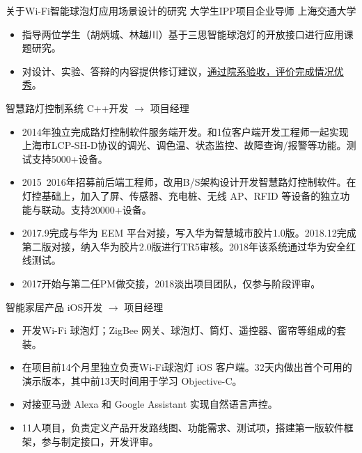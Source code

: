 \documentclass[10pt,a4paper]{moderncv}
\begin{document}
{关于Wi-Fi智能球泡灯应用场景设计的研究}
{大学生IPP项目企业导师}
{上海交通大学}{}
{
\begin{itemize}
	\item 指导两位学生（胡炳城、林越川）基于三思智能球泡灯的开放接口进行应用课题研究。
	\item 对设计、实验、答辩的内容提供修订建议，\href{https://bingcheng1998.github.io/zh-CN/制作/sansi全彩灯泡的app设计.html}{通过院系验收，评价完成情况优秀}。
\end{itemize}
}

{智慧路灯控制系统}
{C++开发 $\rightarrow$ 项目经理}
{}{}
{
\begin{itemize}
	\item 2014年独立完成路灯控制软件服务端开发。和1位客户端开发工程师一起实现上海市LCP-SH-D协议的调光、调色温、状态监控、故障查询/报警等功能。测试支持5000+设备。
	\item 2015~2016年招募前后端工程师，改用B/S架构设计开发智慧路灯控制软件。在灯控基础上，加入了屏、传感器、充电桩、无线 AP、RFID 等设备的独立功能与联动。支持20000+设备。
	\item 2017.9完成与华为 EEM 平台对接，写入华为智慧城市胶片1.0版。2018.12完成第二版对接，纳入华为胶片2.0版进行TR5审核。2018年该系统通过华为安全红线测试。
	\item 2017开始与第二任PM做交接，2018淡出项目团队，仅参与阶段评审。
\end{itemize}
}
%

{智能家居产品}
{iOS开发 $\rightarrow$ 项目经理}
{}{}
{
\begin{itemize}
	\item 开发Wi-Fi 球泡灯；ZigBee 网关、球泡灯、筒灯、遥控器、窗帘等组成的套装。
	\item 在项目前14个月里独立负责Wi-Fi球泡灯 iOS 客户端。32天内做出首个可用的演示版本，其中前13天时间用于学习 Objective-C。
	\item 对接亚马逊 Alexa 和 Google Assistant 实现自然语言声控。
	\item 11人项目，负责定义产品开发路线图、功能需求、测试项，搭建第一版软件框架，参与制定接口，开发评审。
\end{itemize}
}
\end{document}
